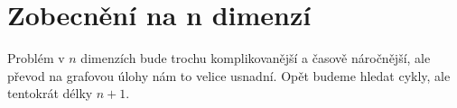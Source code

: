 \chapter{Zobecnění na n dimenzí}
\label{chap:n_dimenzi}

Problém v $n$ dimenzích bude trochu komplikovanější a časově náročnější, ale převod na grafovou úlohy nám to velice usnadní. Opět budeme hledat cykly, ale tentokrát délky $n+1$.




